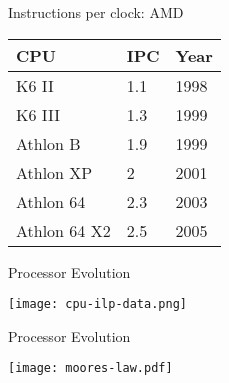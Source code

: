 \documentclass[english,compress]{beamer}
\begin{document}
\begin{frame}{Instructions per clock: AMD}
  \begin{center}
    \begin{tabular}{l|l|l}
      CPU & IPC & Year\\
      \hline
      K6 II          &1.1 & 1998\\
      K6 III         &1.3 & 1999\\
      Athlon B       &1.9 & 1999 \\
      Athlon XP      &2 & 2001 \\
      Athlon 64      &2.3 & 2003\\
      Athlon 64 X2   &2.5 & 2005\\
    \end{tabular}
  \end{center}
\end{frame}
\begin{frame}{Processor Evolution}
  \begin{center}
    \texttt{[image: cpu-ilp-data.png]}
  \end{center}
\end{frame}
\begin{frame}{Processor Evolution}
  \begin{center}
    \texttt{[image: moores-law.pdf]}
  \end{center}
\end{frame}
\end{document}
